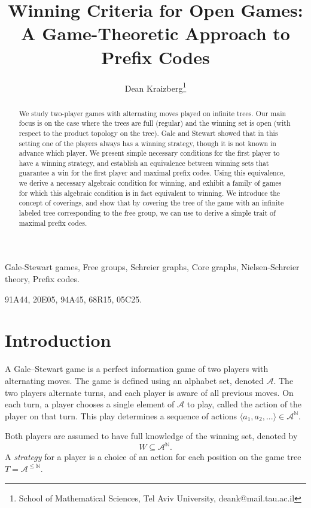 \documentclass[a4,12pt]{article}%
\newcommand{\N}{\mathbb{N}}
\begin{document}
\title{Winning Criteria for Open Games: A Game-Theoretic Approach to Prefix Codes}

\author{Dean Kraizberg\thanks{School of Mathematical Sciences, Tel Aviv University, deank@mail.tau.ac.il}}
\maketitle

\begin{abstract}
We study two-player games with alternating moves played on infinite trees. Our main focus is on the case where the trees are full (regular) and the winning set is open (with respect to the product topology on the tree). Gale and Stewart showed that in this setting one of the players always has a winning strategy, though it is not known in advance which player. We present simple necessary conditions for the first player to have a winning strategy, and establish an equivalence between winning sets that guarantee a win for the first player and maximal prefix codes. Using this equivalence, we derive a necessary algebraic condition for winning, and exhibit a family of games for which this algebraic condition is in fact equivalent to winning. We introduce the concept of coverings, and show that by covering the tree of the game with an infinite labeled tree corresponding to the free group, we can use  to derive a simple trait of maximal prefix codes.
\end{abstract}
 Gale-Stewart games, Free groups, Schreier graphs, Core graphs, Nielsen-Schreier theory, Prefix codes.

 91A44, 20E05, 94A45, 68R15, 05C25.

\section{Introduction}
A Gale–Stewart game is a perfect information game of two players with alternating moves. The game is defined using an alphabet set, denoted $\mathcal{A}$. The two players alternate turns, and each player is aware of all previous moves. On each turn, a player chooses a single element of $\mathcal{A}$ to play, called the action of the player on that turn. This play determines a sequence of actions $\langle a_1,a_2,... \rangle \in \mathcal{A}^{\N}$.

\medskip

Both players are assumed to have full knowledge of the winning set, denoted by
\[
W \subseteq \mathcal{A}^{\mathbb{N}}.
\]
A \emph{strategy} for a player is a choice of an action for each position on the game tree $T = \mathcal{A}^{\leq\N}$.
\end{document}
